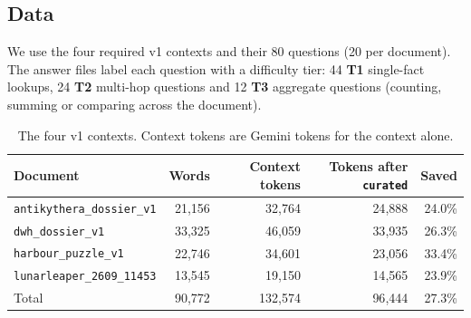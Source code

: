\documentclass[11pt]{article}
\newcommand{\code}[1]{\texttt{#1}}
\begin{document}
\subsection{Data}
We use the four required v1 contexts and their 80 questions (20 per document). The answer files label
each question with a difficulty tier: 44 \textbf{T1} single-fact lookups, 24 \textbf{T2} multi-hop
questions and 12 \textbf{T3} aggregate questions (counting, summing or comparing across the
document).

\begin{table}[h]
\centering
\small
\begin{tabular}{@{}lrrrr@{}}
\toprule
Document & Words & Context tokens & Tokens after \code{curated} & Saved \\
\midrule
\code{antikythera\_dossier\_v1} & 21{,}156 & 32{,}764 & 24{,}888 & 24.0\% \\
\code{dwh\_dossier\_v1}         & 33{,}325 & 46{,}059 & 33{,}935 & 26.3\% \\
\code{harbour\_puzzle\_v1}      & 22{,}746 & 34{,}601 & 23{,}056 & 33.4\% \\
\code{lunarleaper\_2609\_11453} & 13{,}545 & 19{,}150 & 14{,}565 & 23.9\% \\
\midrule
Total & 90{,}772 & 132{,}574 & 96{,}444 & 27.3\% \\
\bottomrule
\end{tabular}
\caption{The four v1 contexts. Context tokens are Gemini tokens for the context alone.}
\label{tab:data}
\end{table}
\end{document}
